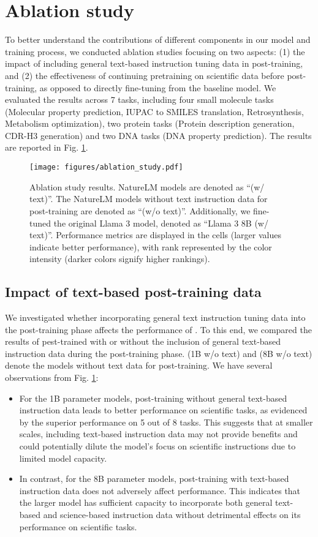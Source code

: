 \section{Ablation study}\label{sec:ablation_study}
To better understand the contributions of different components in our model and training process, we conducted ablation studies focusing on two aspects: (1) the impact of including general text-based instruction tuning data in post-training, and (2) the effectiveness of continuing pretraining on scientific data before post-training, as opposed to directly fine-tuning from the baseline model. We evaluated the results across 7 tasks, including four small molecule tasks (Molecular property prediction, IUPAC to SMILES translation, Retrosynthesis, Metabolism optimization), two protein tasks (Protein description generation, CDR-H3 generation) and two DNA tasks (DNA property prediction). The results are reported in Fig. \ref{fig:ablation_study}. 

\begin{figure}[!htbp]
\centering
\texttt{[image: figures/ablation\_study.pdf]}
\caption{Ablation study results. NatureLM models are denoted as ``(w/ text)''. The NatureLM models without text instruction data for post-training are denoted as ``(w/o text)''. Additionally, we fine-tuned the original Llama 3 model, denoted as ``Llama 3 8B (w/ text)''. Performance metrics are displayed in the cells (larger values indicate better performance), with rank represented by the color intensity (darker colors signify higher rankings).}
\label{fig:ablation_study}
\end{figure}

\subsection{Impact of text-based post-training data}
We investigated whether incorporating general text instruction tuning data into the post-training phase affects the performance of \ourM{}. To this end, we compared the results of \ourM{} pest-trained with or without the inclusion of general text-based instruction data during the post-training phase. \ourM{} (1B w/o text) and \ourM{} (8B w/o text) denote the models without text data for post-training. We have several observations from Fig. \ref{fig:ablation_study}:
\begin{itemize}
\item For the 1B parameter models, post-training without general text-based instruction data leads to better performance on scientific tasks, as evidenced by the superior performance on 5 out of 8 tasks. This suggests that at smaller scales, including text-based instruction data may not provide benefits and could potentially dilute the model's focus on scientific instructions due to limited model capacity.
\item In contrast, for the 8B parameter models, post-training with text-based instruction data does not adversely affect performance. This indicates that the larger model has sufficient capacity to incorporate both general text-based and science-based instruction data without detrimental effects on its performance on scientific tasks.
\end{itemize}

